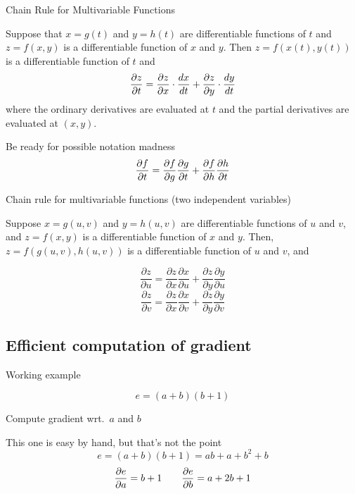 \documentclass[12pt,aspectratio=169]{beamer}
\begin{document}
\begin{frame}{Chain Rule for Multivariable Functions}


Suppose that $x=g(t)$ and $y=h(t)$ are differentiable functions of $t$ and $z=f(x,y)$ is a differentiable function of $x$ and $y$. Then $z=f(x(t),y(t))$ is a differentiable function of $t$ and
$$
\pdv{z}{t} =  \pdv{z}{x} \cdot \frac{dx}{dt} + \pdv{z}{y} \cdot \frac{dy}{dt}
$$
where the ordinary derivatives are evaluated at $t$ and the partial derivatives are evaluated at $(x,y)$.

\pause

\begin{block}{Be ready for possible notation madness}
$$
\pdv{f}{t} =  \pdv{f}{g} \pdv{g}{t} + \pdv{f}{h} \pdv{h}{t}
$$
\end{block}

\end{frame}


\begin{frame}{Chain rule for multivariable functions (two independent variables)}

Suppose $x=g(u,v)$ and $y=h(u,v)$ are differentiable functions of $u$ and $v$, and $z=f(x,y)$ is a differentiable function of $x$ and $y$. Then, $z=f(g(u,v),h(u,v))$ is a differentiable function of $u$ and $v$, and

$$
\frac{\partial z}{\partial u} = \frac{\partial z}{\partial x} \frac{\partial x}{\partial u} + \frac{\partial z}{\partial y} \frac{\partial y}{\partial u}
$$
$$
\frac{\partial z}{\partial v} = \frac{\partial z}{\partial x} \frac{\partial x}{\partial v} + \frac{\partial z}{\partial y} \frac{\partial y}{\partial v}
$$

\end{frame}

\subsection{Efficient computation of gradient}

\begin{frame}{Working example}
	
$$
e = (a + b)(b + 1)
$$

Compute gradient wrt.\ $a$ and $b$

\bigskip

\pause

\begin{block}{This one is easy by hand, but that's not the point}
$$
e = (a + b)(b + 1) = ab + a + b^2 + b
$$
$$
\pdv{e}{a} = b + 1 \qquad \pdv{e}{b} = a + 2b + 1
$$
\end{block}

\end{frame}
\end{document}

